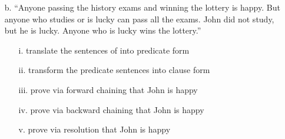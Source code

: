 \documentclass[11pt]{article}
\begin{document}
\begin{flushleft}
\begin{enumerate}
    \item[b.] “Anyone passing the history exams and winning the lottery is
        happy.  But anyone who studies or is lucky can pass all the exams.
        John did not study, but he is lucky.  Anyone who is lucky wins the
        lottery.”  

        \begin{enumerate}
            \item[i.] translate the sentences of into predicate form
            \item[ii.] transform the predicate sentences into clause form
            \item[iii.] prove via forward chaining that John is happy
            \item[iv.] prove via backward chaining that John is happy
            \item[v.] prove via resolution that John is happy
        \end{enumerate}

\end{enumerate}

\end{flushleft}
\end{document}
